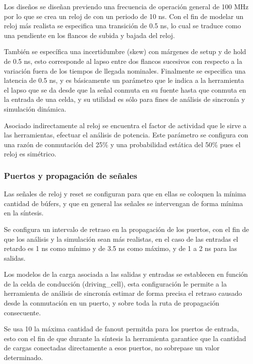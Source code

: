 Los diseños se diseñan previendo una frecuencia de operación general de 100 MHz por lo que se crea un reloj de con un periodo de 10 ns. Con el fin de modelar un reloj más realista se especifica una transición de 0.5 ns, lo cual se traduce como una pendiente en los flancos de subida y bajada del reloj.

También se específica una incertidumbre (skew) con márgenes de setup y de hold de 0.5 ns, esto corresponde al lapso entre dos flancos sucesivos con respecto a la variación fuera de los tiempos de llegada nominales. Finalmente se especifica una latencia de 0.5 ns, y es básicamente un parámetro que le indica a la herramienta el lapso que se da desde que la señal conmuta en su fuente hasta que conmuta en la entrada de una celda, y su utilidad es sólo para fines de análisis de sincronía y simulación dinámica.

Asociado indirectamente al reloj se encuentra el factor de actividad que le sirve a las herramientas, efectuar el análisis de potencia. Este parámetro se configura con una razón de conmutación del 25\% y una probabilidad estática del 50\% pues el reloj es simétrico.

\subsubsection{Puertos y propagación de señales}

Las señales de reloj y reset se configuran para que en ellas se coloquen la mínima cantidad de búfers, y que en general las señales se intervengan de forma mínima en la síntesis. 

Se configura un intervalo de retraso en la propagación de los puertos, con el fin de que los análisis y la simulación sean más realistas, en el caso de las entradas el retardo es 1 ns como mínimo y de 3.5 ns como máximo, y de 1 a 2 ns para las salidas.

Los modelos de la carga asociada a las salidas y entradas se establecen en función de la celda de conducción (driving\_cell), esta configuración le permite a la herramienta de análisis de sincronía estimar de forma precisa el retraso causado desde la conmutación en un puerto, y sobre toda la ruta de propagación consecuente.

Se usa 10 la máxima cantidad de fanout permitda para los puertos de entrada, esto con el fin de que durante la síntesis la herramienta garantice que la cantidad de cargas conectadas directamente a esos puertos, no sobrepase un valor determinado.

